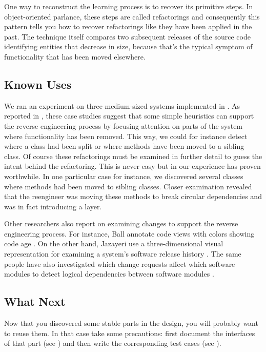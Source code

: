 \documentclass[a4paper,10pt,twoside]{book}
\begin{document}
One way to reconstruct the learning process is to recover its primitive steps. In object-oriented parlance, these steps are called refactorings and consequently this pattern tells you how to recover refactorings like they have been applied in the past. The technique itself compares two subsequent releases of the source code identifying entities that decrease in size, because that's the typical symptom of functionality that has been moved elsewhere.

\subsection*{Known Uses}

We ran an experiment on three medium-sized systems implemented in . As reported in \cite{Deme00a}, these case studies suggest that some simple heuristics can support the reverse engineering process by focusing attention on parts of the system where functionality has been removed. This way, we could for instance detect where a class had been split or where methods have been moved to a sibling class. Of course these refactorings must be examined in further detail to guess the intent behind the refactoring. This is never easy but in our experience has proven worthwhile. In one particular case for instance, we discovered several classes where methods had been moved to sibling classes. Closer examination revealed that the reengineer was moving these methods to break circular dependencies and was in fact introducing a layer.

Other researchers also report on examining changes to support the reverse engineering process. For instance, Ball \etal annotate code views with colors showing code age \cite{Ball96a}. On the other hand, Jazayeri \etal use a three-dimensional visual representation for examining a system's software release history \cite{Jaza99a}. The same people have also investigated which change requests affect which software modules to detect logical dependencies between software modules \cite{Gall98a}.

\subsection*{What Next}

Now that you discovered some stable parts in the design, you will probably want to reuse them. In that case take some precautions: first document the interfaces of that part (see ) and then write the corresponding test cases (see ).
\end{document}
